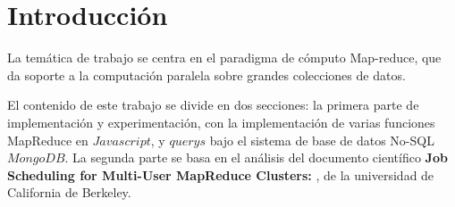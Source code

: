 \section{Introducci\'on}

La tem\'atica de trabajo se centra en el paradigma de c\'omputo Map-reduce, que da soporte a la computaci\'on paralela sobre grandes colecciones de datos.
\vspace{2mm}


El contenido de este trabajo se divide en dos secciones: la primera parte de implementaci\'on y experimentaci\'on, con la implementaci\'on de varias funciones MapReduce en $Javascript$, y $querys$ bajo el sistema de base de datos No-SQL $MongoDB$. La segunda parte se basa en el an\'alisis del documento cient\'ifico \textbf{Job Scheduling for Multi-User MapReduce Clusters: }, de la universidad  de California de Berkeley. 

\vspace{2mm}

